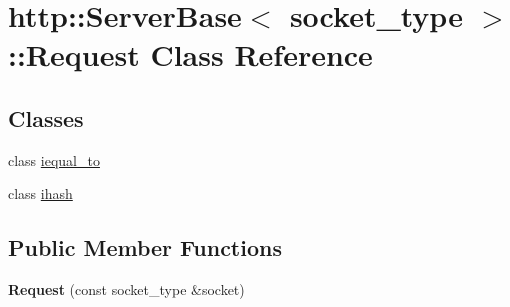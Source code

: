 \hypertarget{classhttp_1_1_server_base_1_1_request}{}\section{http\+:\+:Server\+Base$<$ socket\+\_\+type $>$\+:\+:Request Class Reference}
\label{classhttp_1_1_server_base_1_1_request}
\subsection*{Classes}
\begin{DoxyCompactItemize}
\item 
class \hyperlink{classhttp_1_1_server_base_1_1_request_1_1iequal__to}{iequal\+\_\+to}
\item 
class \hyperlink{classhttp_1_1_server_base_1_1_request_1_1ihash}{ihash}
\end{DoxyCompactItemize}
\subsection*{Public Member Functions}
\begin{DoxyCompactItemize}
\item 
\mbox{\label{classhttp_1_1_server_base_1_1_request_af135a64a268ae6b162a52e86a52f3d6d}} 
{\bfseries Request} (const socket\+\_\+type \&socket)
\end{DoxyCompactItemize}

